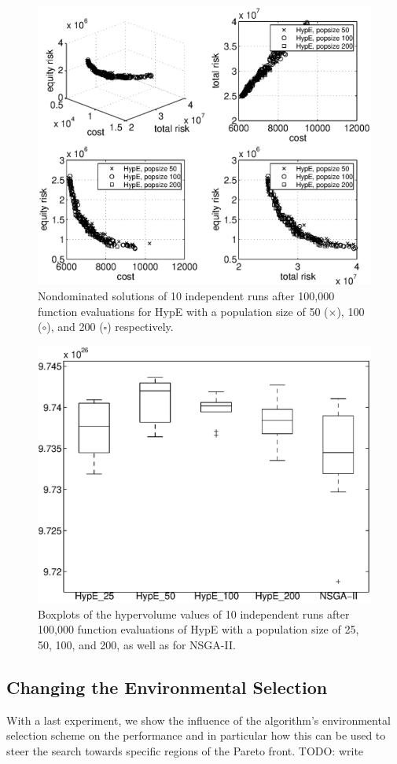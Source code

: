 \documentclass[preprint,12pt]{elsarticle}
\newcommand{\TODO}[1]{{\color{red}TODO: #1}}
\begin{document}
\begin{figure}%
	\centering
	\includegraphics[width=0.8\columnwidth]{../experiments/randVsCost/diffPopsizes}%
	\caption{\label{fig:popsizes} Nondominated solutions of 10 independent runs after 100,000 function evaluations for HypE with a population size of 50 ($\times$), 100 ($\circ$), and 200 ($\square$) respectively.}
\end{figure}

\begin{figure}%
	\centering
	\includegraphics[width=0.5\columnwidth]{../experiments/randVsCost/hypervolumes/algoComparison}%
	\caption{\label{fig:algoComparison} Boxplots of the hypervolume values of 10 independent runs after 100,000 function evaluations of HypE with a population size of 25, 50, 100, and 200, as well as for NSGA-II.}
\end{figure}

\subsection{Changing the Environmental Selection}
With a last experiment, we show the influence of the algorithm's environmental selection scheme on the performance and in particular how this can be used to steer the search towards specific regions of the Pareto front.
\TODO{write}
\end{document}
